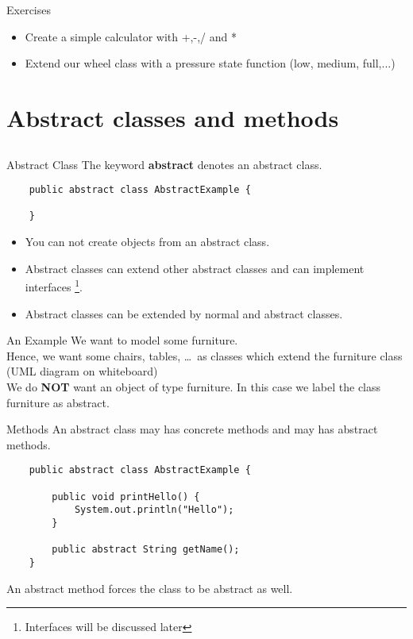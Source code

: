 \begin{frame}[fragile]{Exercises}	
	\begin{itemize}
		\item Create a simple calculator with +,-,/ and *
		\vspace{0.5cm}
		\item Extend our wheel class with a pressure state function (low, medium, full,...)
	\end{itemize}
\end{frame}

\section{Abstract classes and methods}
\subsection{}
\begin{frame}[fragile]{Abstract Class}
	The keyword \textbf{abstract} denotes an abstract class.
	\vfill
	\begin{lstlisting}
	public abstract class AbstractExample {
	
	}	
	\end{lstlisting}
	\vfill
    \begin{itemize}
	\item You can not create objects from an abstract class.\\
	\item Abstract classes can extend other abstract classes and can implement interfaces \footnote[1]{Interfaces will be discussed later}.\\
	\item Abstract classes can be extended by normal and abstract classes.
    \end{itemize}
\end{frame}

\begin{frame}[fragile]{An Example}
	We want to model some furniture. \\
	\vspace{0.5cm}
	Hence, we want some chairs, tables, \dots\ as classes which extend the furniture class (UML diagram on whiteboard)\\
	\vspace{0.25cm}
	We do \textbf{NOT} want an object of type furniture. In this case we label the class furniture as abstract.
\end{frame}

\begin{frame}[fragile]{Methods}
	An abstract class may has concrete methods and may has abstract methods.
	\begin{lstlisting}
	public abstract class AbstractExample {
	
	    public void printHello() {
	        System.out.println("Hello");	    
	    }
	    
	    public abstract String getName();
	}	
	\end{lstlisting}
	An abstract method forces the class to be abstract as well. \\
\end{frame}


